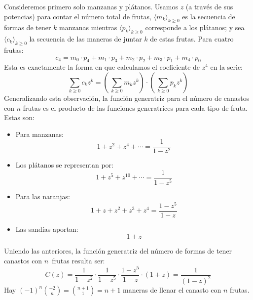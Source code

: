   Consideremos primero solo manzanas y plátanos.
  Usamos \(z\)
  (a través de sus potencias)
  para contar el número total de frutas,
  \(\langle m_k \rangle_{k \ge 0}\)
  es la secuencia de formas de tener \(k\) manzanas
  mientras \(\langle p_k \rangle_{k \ge 0}\)
  corresponde a los plátanos;
  y sea \(\langle c_k \rangle_{k \ge 0}\)
  la secuencia de las maneras de juntar \(k\) de estas frutas.
  Para cuatro frutas:
  \begin{equation*}
    c_4
      = m_0 \cdot p_4
	 + m_1 \cdot p_3
	 + m_2 \cdot p_2
	 + m_3 \cdot p_1
	 + m_4 \cdot p_0
  \end{equation*}
  Esta es exactamente la forma
  en que calculamos el coeficiente de \(z^4\) en la serie:
  \begin{equation*}
    \sum_{k \ge 0} c_k z^k
      = \left( \, \sum_{k \ge 0} m_k z^k \right)
	  \cdot \left( \, \sum_{k \ge 0} p_k z^k \right)
  \end{equation*}
  Generalizando esta observación,
  la función generatriz para el número de canastos con \(n\) frutas
  es el producto de las funciones generatrices
  para cada tipo de fruta.
  Estas son:
  \begin{itemize}
  \item Para manzanas:
    \begin{equation*}
      1 + z^2 + z^4 + \dotsb
	= \frac{1}{1 - z^2}
    \end{equation*}
  \item Los plátanos se representan por:
    \begin{equation*}
      1 + z^5 + z^{10} + \dotsb
	= \frac{1}{1 - z^5}
    \end{equation*}
  \item Para las naranjas:
    \begin{equation*}
      1 + z + z^2 + z^3 + z^4
	= \frac{1 - z^5}{1 - z}
    \end{equation*}
  \item Las sandías aportan:
    \begin{equation*}
      1 + z
    \end{equation*}
  \end{itemize}
  Uniendo las anteriores,
  la función generatriz del número de formas
  de tener canastos con \(n\)~frutas resulta ser:
  \begin{equation*}
    C(z)
      = \frac{1}{1 - z^2}
	  \cdot \frac{1}{1 - z^5}
	  \cdot \frac{1 - z^5}{1 - z}
	  \cdot (1 + z)
      = \frac{1}{(1 - z)^2}
  \end{equation*}
  Hay
  \((-1)^n \binom{-2}{n} = \binom{n + 1}{1} = n + 1\)
  maneras de llenar el canasto con \(n\) frutas.

